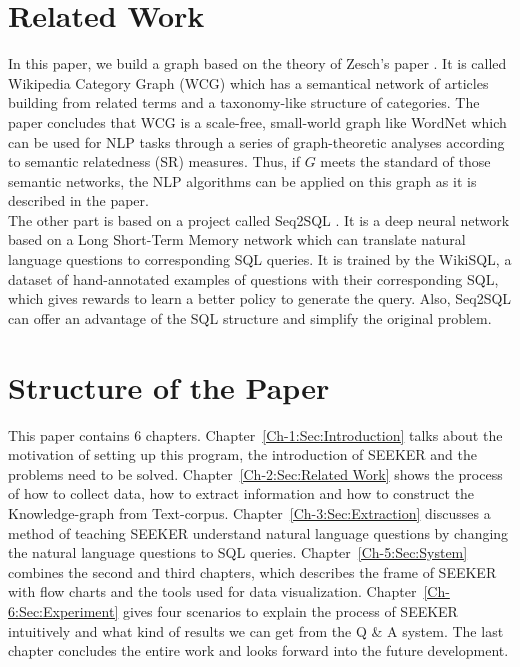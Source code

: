 \section{Related Work}
\vspace{-5pt}
\label{Ch-2:Sec:Related Work}
In this paper, we build a graph based on the theory of Zesch's paper \cite{zesch2007analysis}. It is called Wikipedia Category Graph (WCG) which has a semantical network of articles building from related terms and a taxonomy-like structure of categories. The paper concludes that WCG is a scale-free, small-world graph like WordNet \cite{miller1998wordnet} which can be used for NLP tasks through a series of graph-theoretic analyses according to semantic relatedness (SR) measures. Thus, if $G$ meets the standard of those semantic networks, the NLP algorithms can be applied on this graph as it is described in the paper.\\
The other part is based on a project called Seq2SQL \cite{zhongSeq2SQL2017}. It is a deep neural network based on a Long Short-Term Memory network \cite{hochreiter1997long} which can translate natural language questions to corresponding SQL queries. It is trained by the WikiSQL, a dataset of hand-annotated examples of questions with their corresponding SQL, which gives rewards to learn a better policy to generate the query. Also, Seq2SQL can offer an advantage of the SQL structure and simplify the original problem.

\section{Structure of the Paper}
\vspace{-5pt}
This paper contains 6 chapters. Chapter~\ref{Ch-1:Sec:Introduction} talks about the motivation of setting up this program, the introduction of SEEKER and the problems need to be solved. Chapter~\ref{Ch-2:Sec:Related Work} shows the process of how to collect data, how to extract information and how to construct the Knowledge-graph from Text-corpus. Chapter~\ref{Ch-3:Sec:Extraction} discusses a method of teaching SEEKER understand natural language questions by changing the natural language questions to SQL queries. Chapter~\ref{Ch-5:Sec:System} combines the second and third chapters, which describes the frame of SEEKER with flow charts and the tools used for data visualization. Chapter~\ref{Ch-6:Sec:Experiment} gives four scenarios to explain the process of SEEKER intuitively and what kind of results we can get from the Q \& A system. The last chapter concludes the entire work and looks forward into the future development.